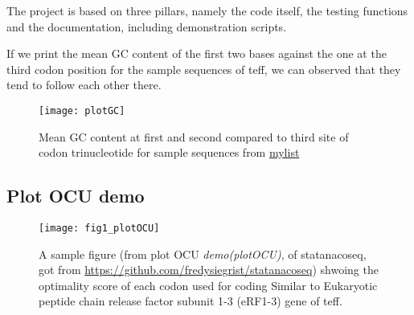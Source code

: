 
The project is based on three pillars, namely the code itself, the testing functions and the documentation, including demonstration scripts.


If we print the mean GC content of the first two bases against the one at the third codon position for the sample sequences of teff, we can observed that they tend to follow each other there. 

\begin{figure}[tb] 
\centering 
\texttt{[image: plotGC]} 
\caption[GC percentage at synonymous sites]{Mean GC content at first and second compared to third site of codon trinucleotide for sample sequences from \hyperlink{function:mylist}{mylist}}
\label{fig:plotGC} 
\end{figure} 


\subsection{Plot OCU demo}
\begin{figure}[tb] 
\centering 
\texttt{[image: fig1\_plotOCU]} 
\caption[A sample figure from demo plotOCU]{A sample figure (from plot OCU \emph{demo(plotOCU)}, of statanacoseq, got from \url{https://github.com/fredysiegrist/statanacoseq}) shwoing the optimality score of each codon used for coding Similar to Eukaryotic peptide chain release factor subunit 1-3 (eRF1-3) gene of teff.}
\label{fig:plotOCU} 
\end{figure}
